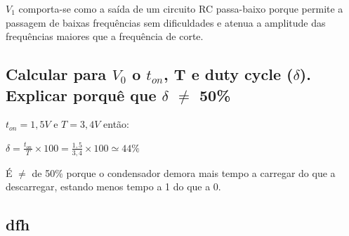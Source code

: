 \documentclass[pdftex,12pt,a4paper]{report}
\begin{document}
$V_1$ comporta-se como a saída de um circuito RC passa-baixo porque permite a passagem de baixas frequências sem dificuldades e atenua a amplitude das frequências maiores que a frequência de corte.
\vspace{0.5cm}

\subsection{Calcular para $V_0$ o $t_{on}$, T e duty cycle ($\delta$). Explicar porquê que $\delta$ $\neq$ 50\%}

$t_{on} = 1,5V$ e $T = 3,4V$ então:
\vspace{0.3cm}

$\delta = \frac{t_{on}}{T}\times100 = \frac{1,5}{3,4}\times100 \simeq 44 \% $
\vspace{0.3cm}

É $\neq$ de 50\% porque o condensador demora mais tempo a carregar do que a descarregar, estando menos tempo a 1 do que a 0.

\subsection{dfh}
\end{document}
